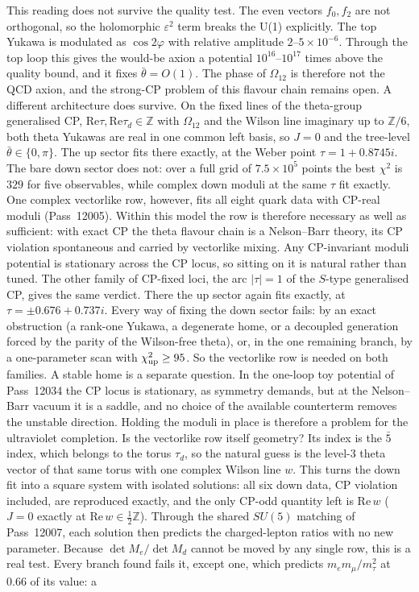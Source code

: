  This reading does not survive the quality test. The even vectors $f_0,f_2$ are not orthogonal, so the holomorphic $\varepsilon^2$ term breaks the U(1) explicitly. The top Yukawa is modulated as $\cos2\varphi$ with relative amplitude $2$--$5\times10^{-6}$. Through the top loop this gives the would-be axion a potential $10^{16}$--$10^{17}$ times above the quality bound, and it fixes $\bar\theta=O(1)$. The phase of $\Omega_{12}$ is therefore not the QCD axion, and the strong-CP problem of this flavour chain remains open.  A different architecture does survive. On the fixed lines of the theta-group generalised CP, $\mathrm{Re}\tau,\mathrm{Re}\tau_d\in\mathbb Z$ with $\Omega_{12}$ and the Wilson line imaginary up to $\mathbb Z/6$, both theta Yukawas are real in one common left basis, so $J=0$ and the tree-level $\bar\theta\in\{0,\pi\}$. The up sector fits there exactly, at the Weber point $\tau=1+0.8745i$. The bare down sector does not: over a full grid of $7.5\times10^5$ points the best $\chi^2$ is $329$ for five observables, while complex down moduli at the same $\tau$ fit exactly. One complex vectorlike row, however, fits all eight quark data with CP-real moduli (Pass~12005). Within this model the row is therefore necessary as well as sufficient: with exact CP the theta flavour chain is a Nelson--Barr theory, its CP violation spontaneous and carried by vectorlike mixing. Any CP-invariant moduli potential is stationary across the CP locus, so sitting on it is natural rather than tuned.  The other family of CP-fixed loci, the arc $|\tau|=1$ of the $S$-type generalised CP, gives the same verdict. There the up sector again fits exactly, at $\tau=\pm0.676+0.737i$. Every way of fixing the down sector fails: by an exact obstruction (a rank-one Yukawa, a degenerate home, or a decoupled generation forced by the parity of the Wilson-free theta), or, in the one remaining branch, by a one-parameter scan with $\chi^2_{\rm up}\ge95$. So the vectorlike row is needed on both families. A stable home is a separate question. In the one-loop toy potential of Pass~12034 the CP locus is stationary, as symmetry demands, but at the Nelson--Barr vacuum it is a saddle, and no choice of the available counterterm removes the unstable direction. Holding the moduli in place is therefore a problem for the ultraviolet completion.  Is the vectorlike row itself geometry? Its index is the $\bar5$ index, which belongs to the torus $\tau_d$, so the natural guess is the level-3 theta vector of that same torus with one complex Wilson line $w$. This turns the down fit into a square system with isolated solutions: all six down data, CP violation included, are reproduced exactly, and the only CP-odd quantity left is $\mathrm{Re}\,w$ ($J=0$ exactly at $\mathrm{Re}\,w\in\tfrac12\mathbb Z$). Through the shared $SU(5)$ matching of Pass~12007, each solution then predicts the charged-lepton ratios with no new parameter. Because $\det M_e/\det M_d$ cannot be moved by any single row, this is a real test. Every branch found fails it, except one, which predicts $m_em_\mu/m_\tau^2$ at $0.66$ of its value: a 